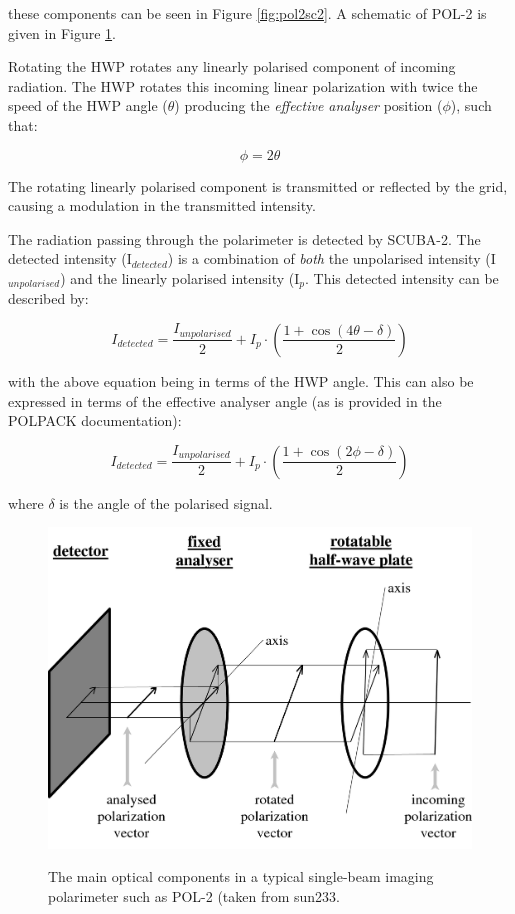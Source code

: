 these components can be seen in Figure \ref{fig:pol2sc2}. 
A schematic of POL-2 is given in Figure \ref{fig:pol2sc2diagram}.


Rotating the HWP rotates any linearly polarised component of incoming
radiation. The HWP rotates this incoming linear polarization with twice 
the speed of the HWP angle ($\theta$) producing the \emph{effective 
analyser} position ($\phi$), such that:


\begin{equation}
\phi = 2 \theta
\end{equation}


The rotating linearly polarised component is
transmitted or reflected by the grid, causing a modulation in the transmitted
intensity.

The radiation passing through the polarimeter is detected by
SCUBA-2. The detected intensity (I$_{detected}$) is a
combination of \emph{both} the unpolarised intensity (I$_{unpolarised}$)
and the linearly polarised intensity (I$_{p}$. This detected intensity can be
described by:


\begin{equation}
I_{detected} = \frac{I_{unpolarised}}{2}+ I_{p}\cdot\left(\frac{1+\cos(4\theta - \delta)}{2} \right)
\end{equation}

with the above equation being in terms of the HWP angle. This can also be expressed in terms 
of the effective analyser angle (as is provided in the POLPACK documentation):


\begin{equation}
I_{detected} = \frac{I_{unpolarised}}{2}+ I_{p}\cdot\left(\frac{1+\cos(2\phi - \delta)}{2} \right)
\end{equation}

where $\delta$ is the angle of the polarised signal.


\begin{figure}[t!]
\begin{center}
\includegraphics[width=0.8\linewidth]{singopt.png}
\label{fig:pol2sc2diagram}
\caption [POL-2 optical components]{
  \small The main optical components in a typical single-beam imaging polarimeter such as POL-2 (taken from sun233.}
\end{center}
\end{figure}

